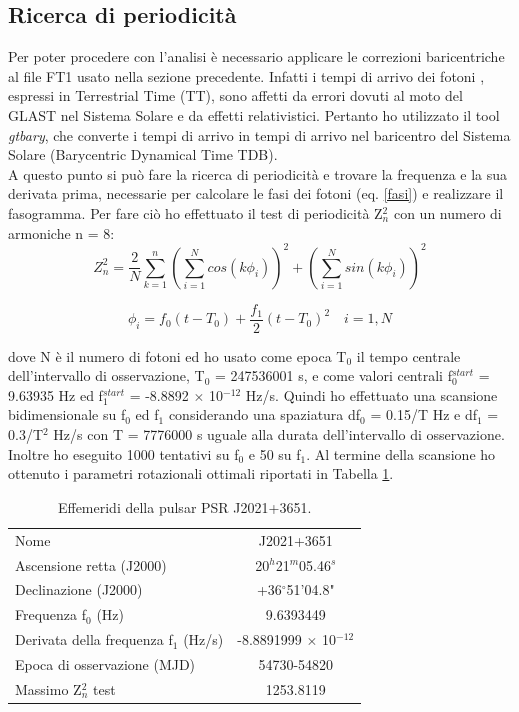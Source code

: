 \documentclass[a4paper,twocolumn]{article}
\begin{document}
\begin{large}

\section{Ricerca di periodicità}
Per poter procedere con l'analisi è necessario applicare le correzioni baricentriche al file FT1 usato nella sezione precedente. Infatti i tempi di arrivo dei fotoni , espressi in Terrestrial Time (TT), sono affetti da errori dovuti al moto del GLAST nel Sistema Solare e da effetti relativistici. Pertanto ho utilizzato il tool \textit{gtbary}, che converte i tempi di arrivo in tempi di arrivo nel baricentro del Sistema Solare (Barycentric Dynamical Time TDB).  \\
A questo punto si può fare la ricerca di periodicità e trovare la frequenza e la sua derivata prima, necessarie per calcolare le fasi dei fotoni (eq. \ref{fasi}) e realizzare il fasogramma. Per fare ciò ho effettuato il test di periodicità Z$^2_{n}$ con un numero di armoniche n = 8:
\begin{equation}
Z^2_n = \frac{2}{N} \sum\limits_{k=1}^n \left(\sum\limits_{i=1}^N cos(k\phi_i)\right)^2 + \left(\sum\limits_{i=1}^N sin(k\phi_i)\right)^2
\end{equation}

\begin{equation}
\phi_i = f_0 (t-T_0) + \frac{f_1}{2} (t-T_0)^2  \quad i = 1,N
\label{fasi}
\end{equation}

\noindent
dove N è il numero di fotoni ed ho usato come epoca T$_0$ il tempo centrale dell'intervallo di osservazione, T$_0$ = 247536001 s, e come valori centrali f$_0^{start}$ = 9.63935 Hz ed f$_1^{start}$ = -8.8892 $\times$ 10$^{-12}$ Hz/s. Quindi ho effettuato una scansione bidimensionale su f$_0$ ed f$_1$ considerando una spaziatura df$_0$ = 0.15/T Hz e df$_1$ = 0.3/T$^2$ Hz/s con T = 7776000 s uguale alla durata dell'intervallo di osservazione. Inoltre ho eseguito 1000 tentativi su f$_0$ e 50 su f$_1$.
Al termine della scansione ho ottenuto i parametri rotazionali ottimali riportati in Tabella \ref{ztest}.

\begin{table}[H]
\caption{\small Effemeridi della pulsar PSR J2021+3651.}
\begin{tabular}{lc}
\hline
\hline
Nome & J2021+3651\\
Ascensione retta (J2000) & 20$^h$21$^m$05.46$^s$\\
Declinazione (J2000) &  +36$^\circ$51'04.8"\\
Frequenza f$_0$ (Hz) & 9.6393449\\
Derivata della frequenza f$_1$ (Hz/s) & -8.8891999 $\times$ 10$^{-12}$\\
Epoca di osservazione (MJD) & 54730-54820\\
Massimo Z$^2_n$ test & 1253.8119\\
\hline
\end{tabular}
\label{ztest}
\end{table}


\end{large}
\end{document}
